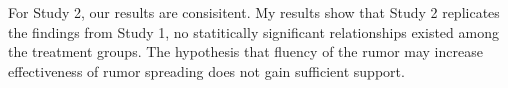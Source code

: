 \documentclass[AER]{AEA}
\begin{document}
For Study 2, our results are consisitent. My results show that Study 2
replicates the findings from Study 1, no statitically significant
relationships existed among the treatment groups. The hypothesis that
fluency of the rumor may increase effectiveness of rumor spreading does
not gain sufficient support.



\end{document}
